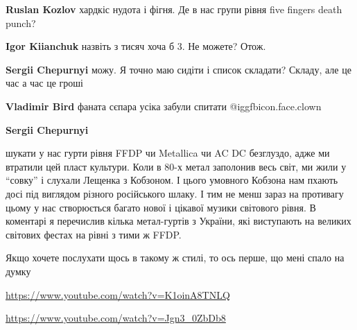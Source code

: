 \begin{itemize}
\begin{itemize}
\textbf{Ruslan Kozlov} хардкіс нудота і фігня. Де в нас групи рівня five fingers death punch?

\textbf{Igor Kiianchuk} назвіть з тисяч хоча б 3. Не можете? Отож.

\textbf{Sergii Chepurnyi} можу. Я точно маю сидіти і список складати? Складу, але це час а час це гроші

\textbf{Vladimir Bird} фаната сєпара усіка забули спитати  @igg{fbicon.face.clown} 

\textbf{Sergii Chepurnyi} 

шукати у нас гурти рівня FFDP чи Metallica чи AC DC безглуздо, адже ми втратили
цей пласт культури. Коли в 80-х метал заполонив весь світ, ми жили у \enquote{совку} і
слухали Лещенка з Кобзоном. І цього умовного Кобзона нам пхають досі під
виглядом різного російського шлаку. І тим не менш зараз на противагу цьому у
нас створюється багато нової і цікавої музики світового рівня. В коментарі я
перечислив кілька метал-гуртів з України, які виступають на великих світових
фестах на рівні з тими ж FFDP.

Якщо хочете послухати щось в такому ж стилі, то ось перше, що мені спало на думку

\url{https://www.youtube.com/watch?v=K1oinA8TNLQ}

\url{https://www.youtube.com/watch?v=Jgn3_0ZbDb8}


\end{itemize} %


\end{itemize} %
